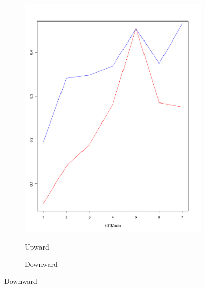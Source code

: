 \documentclass{itatnew}
\begin{document}
\begin{figure}[htp]
  \begin{subfigure}{\linewidth}
    \caption{Upward}
    \includegraphics[width=\linewidth]{images/SoHZoomUp}
    \label{fig:UpwardZoom}
  \end{subfigure}
  \hspace{1em}
  \begin{subfigure}{\linewidth}
    \caption{Downward}

\end{subfigure}
\end{figure}
\end{document}
